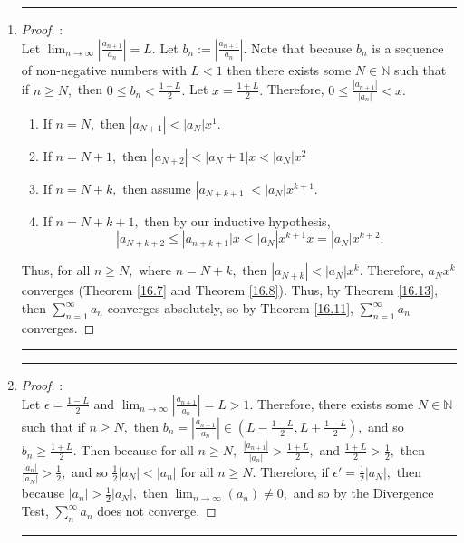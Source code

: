 \documentclass[openany, amssymb, psamsfonts]{amsart}
\newcommand{\bbN}{\mathbb{N}}
\theoremstyle{definition}
\numberwithin{equation}{section}
\begin{document}
\begin{enumerate}
    \item 
\vspace{4pt}     \hrule   \vspace{4pt}\begin{proof}:\\
    Let $\lim_{n\to \infty}|\frac{a_{n+1}}{a_n}| = L.$ Let $b_n:= |\frac{a_{n+1}}{a_n}|.$ Note that because $b_n$ is a sequence of non-negative numbers with $L<1$ then there exists some $N\in \bbN$ such that if $n\geq N,$ then $0\leq b_n< \frac{1+L}{2}.$ Let $x = \frac{1+L}{2}.$ Therefore, $0\leq \frac{|a_{n+1}|}{|a_n|} < x.$ 
    \begin{enumerate}
        \item If $n = N,$ then $|a_{N+1}|< |a_N|x^{1}.$\\
        \item If $n = N+1,$ then $|a_{N+2}|< |a_N+1|x<|a_N|x^2$
        \item If $n = N +k,$ then assume $|a_{N+k+1}|< |a_{N}|x^{k+1}.$
        \item If $n = N+k+1,$ then by our inductive hypothesis, 
        \[|a_{N+k+2}\leq |a_{n+k+1}|x< |a_{N}|x^{k+1}x = |a_{N}|x^{k+2}.\]
    \end{enumerate}
    Thus, for all $n\geq N,$ where $n = N+k,$ then $|a_{N+k}|<|a_N|x^k.$ Therefore,  $a_Nx^k$ converges (Theorem \ref{16.7} and Theorem \ref{16.8}). Thus, by Theorem \ref{16.13}, then $\displaystyle\sum_{n=1}^\infty a_n$ converges absolutely, so by Theorem \ref{16.11}, $\displaystyle\sum_{n=1}^\infty a_n$ converges.
\end{proof}\vspace{4pt}     \hrule   \vspace{4pt}
    \item 
\vspace{4pt}     \hrule   \vspace{4pt}\begin{proof}:\\
Let $\epsilon = \frac{1-L}{2}$ and $\displaystyle\lim_{n\to \infty}|\frac{a_{n+1}}{a_n}| = L > 1.$ Therefore, there exists some $N \in \bbN$ such that if $n\geq N,$ then $b_n = |\frac{a_{n+1}}{a_n}| \in (L - \frac{1-L}{2}, L + \frac{1-L}{2}),$ and so $b_n\geq \frac{1+L}{2}.$ Then because for all $n\geq N,$ $\frac{|a_{n+1}|}{|a_n|}>\frac{1+L}{2},$ and $\frac{1+L}{2}>\frac{1}{2},$ then $\frac{|a_n|}{|a_N|}>\frac{1}{2},$ and so $\frac{1}{2}|a_N|< |a_n|$ for all $n\geq N.$ Therefore, if $\epsilon' = \frac{1}{2}|a_N|,$ then because $|a_n|> \frac{1}{2}|a_N|,$ then $\displaystyle\lim_{n\to \infty}(a_n)\neq 0,$ and so by the Divergence Test, $\displaystyle\sum_{n}^\infty a_n$ does not converge.
\end{proof}\vspace{4pt}     \hrule   \vspace{4pt}
\end{enumerate}
\end{document}
